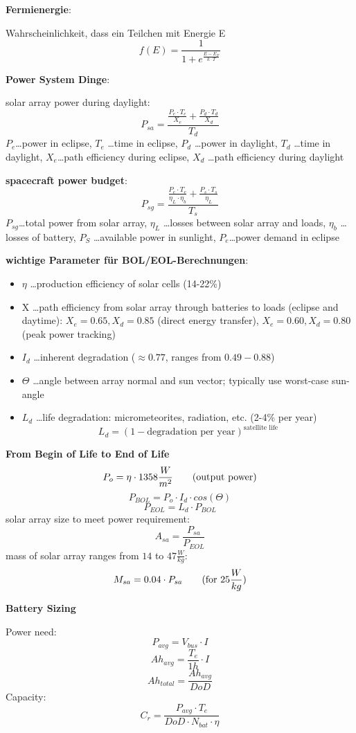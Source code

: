 \documentclass[a4paper,10pt]{article}
\newcommand{\f}{\textbf}
\begin{document}
\noindent %
\f{Fermienergie}:\\
\vspace*{3pt}

\noindent Wahrscheinlichkeit, dass ein Teilchen mit Energie E 
\[f(E) = \frac{1}{1 + e^{\frac{E-E_F}{k\cdot T}}}\]
\vspace*{5pt}

\noindent \f{Power System Dinge}:\\
\vspace*{3pt}

\noindent solar array power during daylight:
\[P_{sa} = \frac{\frac{P_e\cdot T_e}{X_e}+ \frac{P_d\cdot T_d}{X_d}}{T_d}\]
$P_e$\dots power in eclipse, $T_e$ \dots time in eclipse, $P_d$ \dots power in daylight, $T_d$ \dots time in daylight, $X_e$\dots path efficiency during eclipse, $X_d$ \dots path 
efficiency during daylight\\
\vspace*{5pt}

\noindent \f{spacecraft power budget}:
\[P_{sg} = \frac{\frac{P_e\cdot T_e}{\eta_L\cdot \eta_b}+ \frac{P_s\cdot T_s}{\eta_L}}{T_s}\]
$P_{sg}$\dots total power from solar array, $\eta_L$ \dots losses between solar array and loads, $\eta_b$ \dots losses of battery, $P_S$ \dots available power in sunlight, $P_e$\dots power demand in 
eclipse\\
\vspace*{3pt}

\noindent \f{wichtige Parameter für BOL/EOL-Berechnungen}:
\begin{itemize}
 \item $\eta$ \dots production efficiency of solar cells (14-22\%)
 \item X \dots path efficiency from solar array through batteries to loads (eclipse and daytime): $X_e=0.65, X_d=0.85$ (direct energy transfer), $X_e=0.60, X_d=0.80$ (peak power tracking)
 \item $I_d$ \dots inherent degradation ($\approx 0.77$, ranges from $0.49-0.88$)
 \item $\Theta$ \dots angle between array normal and sun vector; typically use worst-case sun-angle
 \item $L_d$ \dots life degradation: micrometeorites, radiation, etc. (2-4\% per year)\[L_d = (1-\text{degradation per year})^{\text{satellite life}}\]
\end{itemize}

\vspace*{5pt}

\noindent \f{From Begin of Life to End of Life}
\[P_{o} = \eta\cdot 1358\frac{W}{m^2} \text{\qquad (output power)}\]
\[P_{BOL} = P_o\cdot I_d\cdot cos(\Theta)\]
\[P_{EOL} = L_d\cdot P_{BOL}\]
solar array size to meet power requirement:
\[A_{sa} = \frac{P_{sa}}{P_{EOL}}\]
mass of solar array ranges from $14$ to $47 \frac{W}{kg}$:
\[M_{sa} = 0.04\cdot P_{sa} \text{\qquad (for } 25 \frac{W}{kg})\]

\noindent \f{Battery Sizing}\\
\vspace*{3pt}

\noindent Power need:
\[P_{avg} = V_{bus}\cdot I\]
\[Ah_{avg} = \frac{T_e}{1h}\cdot I\]
\[Ah_{total} = \frac{Ah_{avg}}{DoD}\]
Capacity:
\[C_r = \frac{P_{avg}\cdot T_e}{DoD\cdot N_{bat} \cdot \eta}\]
\end{document}
